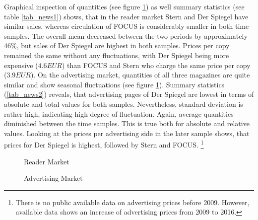 \documentclass[12pt,a4paper,notitlepage]{article}
\begin{document}
Graphical inspection of quantities (see figure \ref{fig_circ_fss1}) as well summary statistics (see table \ref{tab_news1}) shows, that in the reader market Stern and Der Spiegel have similar sales, whereas circulation of FOCUS is considerably smaller in both time samples. The overall mean decreased between the two periods by approximately 46$\%$, but sales of Der Spiegel are highest in both samples. Prices per copy remained the same without any fluctuations, with Der Spiegel being more expensive ($4.6 EUR$) than FOCUS and Stern who charge the same price per copy ($3.9 EUR$). On the advertising market, quantities of all three magazines are quite similar and show seasonal fluctuations (see figure \ref{fig_circ_fss1}). Summary statistics (\ref{tab_news2}) reveals, that advertising pages of Der Spiegel are lowest in terms of absolute and total values for both samples. Nevertheless, standard deviation is rather high, indicating high degree of fluctuation. Again, average quantities diminished between the time samples. This is true both for absolute and relative values. Looking at the prices per advertising side in the later sample shows, that prices for Der Spiegel is highest, followed by Stern and FOCUS. \footnote{There is no public available data on advertising prices before 2009. However, available data shows an increase of advertising prices from 2009 to 2016.}

\begin{figure}[H]
\caption{Reader Market}
\begin{minipage}
	\centering
	
\end{minipage}
\hfil
\begin{minipage}
	\centering
	
\end{minipage}
\label{fig_circ_fss1}
\end{figure}

\begin{figure}[H]
\caption{Advertising Market}
\begin{minipage}
	\centering
	
\end{minipage}
\hfil
\begin{minipage}
	\centering
	
\end{minipage}
\label{fig_ads_fss1}
\end{figure}
\end{document}
